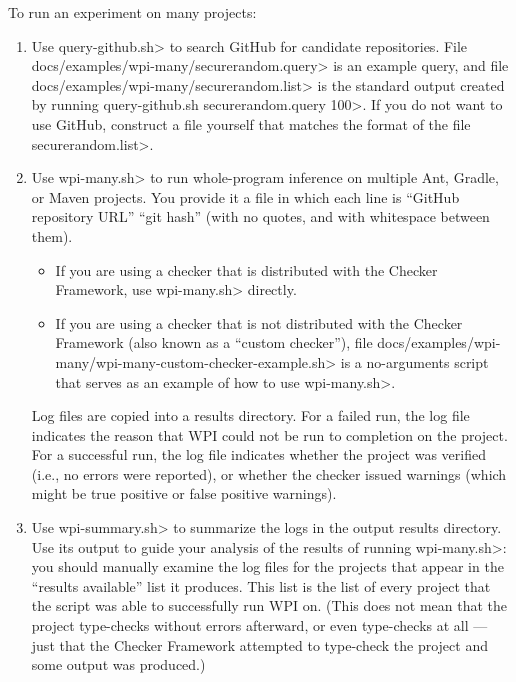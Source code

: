 To run an experiment on many projects:
\begin{enumerate}
\item Use \<query-github.sh> to search GitHub for candidate repositories.
File \<docs/examples/wpi-many/securerandom.query> is an example query, and file
\<docs/examples/wpi-many/securerandom.list> is the standard output
created by running \<query-github.sh securerandom.query 100>. If you do
not want to use GitHub, construct a file yourself that matches the format of
the file \<securerandom.list>.

\item Use \<wpi-many.sh> to run whole-program inference on multiple
Ant, Gradle, or Maven projects.  You provide it a file in which each line
is ``GitHub repository URL'' ``git hash'' (with no quotes, and with
whitespace between them).
\begin{itemize}
\item If you are using a checker that is distributed with the Checker
Framework, use \<wpi-many.sh> directly.
\item If you are using a checker that is not distributed with the Checker
Framework (also known as a ``custom checker''), file
\<docs/examples/wpi-many/wpi-many-custom-checker-example.sh> is a no-arguments
script that serves as an example of how to use \<wpi-many.sh>.
\end{itemize}

Log files are copied into a results directory.
For a failed run, the log file indicates the reason that WPI could not
be run to completion on the project.
For a successful run, the log file indicates whether the project was verified
(i.e., no errors were reported), or whether the checker issued warnings
(which might be true positive or false positive warnings).

\item Use \<wpi-summary.sh> to summarize the logs in the output results directory.
Use its output to guide your analysis of the results of running \<wpi-many.sh>:
you should manually examine the log files for the projects that appear in the
``results available'' list it produces. This list is the list of every project
that the script was able to successfully run WPI on.  (This does not mean
that the project type-checks without errors afterward, or even type-checks at
all --- just that the Checker Framework attempted to type-check the project and
some output was produced.)


\end{enumerate}
